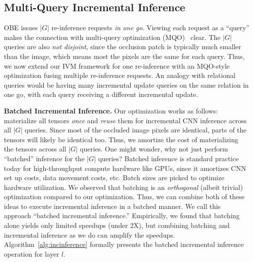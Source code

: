 \subsection{Multi-Query Incremental Inference}
OBE issues $|G|$ re-inference requests \textit{in one go}. Viewing each request as a ``query'' makes the connection with multi-query optimization (MQO)~\cite{sellis1988multiple} clear.
The $|G|$ queries are also \textit{not disjoint}, since the occlusion patch is typically much smaller than the image, which means most the pixels are the same for each query.
Thus, we now extend our IVM framework for one re-inference with an MQO-style optimization fusing multiple re-inference requests.
An analogy with relational queries would be having many incremental update queries on the same relation in one go, with each query receiving a different incremental update. 

\vspace{2mm}
\noindent \textbf{Batched Incremental Inference.}
Our optimization works as follows: materialize all tensors \textit{once} and \textit{reuse} them for incremental CNN inference across all $|G|$ queries. Since most of the occluded image pixels are identical, parts of the tensors will likely be identical too. Thus, we amortize the cost of materializing the tensors across all $|G|$ queries. One might wonder, why not just perform ``batched'' inference for the $|G|$ queries? Batched inference is standard practice today for high-throughput compute hardware like GPUs, since it amortizes CNN set up costs, data movement costs, etc. Batch sizes are picked to optimize hardware utilization. We observed that batching is an \textit{orthogonal} (albeit trivial) optimization compared to our optimization. Thus, we can combine both of these ideas to execute incremental inference in a batched manner. We call this approach ``batched incremental inference.'' Empirically, we found that batching alone yields only limited speedups (under $2$X), but combining batching and incremental inference as we do can amplify the speedups. Algorithm~\ref{alg:incinference} formally presents the batched incremental inference operation for layer $l$.

